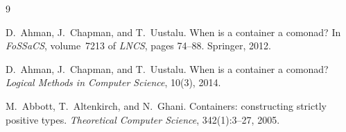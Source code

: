 \documentclass[11pt,a4paper]{article}
\theoremstyle{plain}
\theoremstyle{definition}
\begin{document}
\begin{thebibliography}{9}

D.~Ahman, J.~Chapman, and T.~Uustalu.
\newblock When is a container a comonad?
\newblock In \emph{FoSSaCS}, volume~7213 of \emph{LNCS}, pages 74--88.
\newblock Springer, 2012.

D.~Ahman, J.~Chapman, and T.~Uustalu.
\newblock When is a container a comonad?
\newblock \emph{Logical Methods in Computer Science}, 10(3), 2014.

M.~Abbott, T.~Altenkirch, and N.~Ghani.
\newblock Containers: constructing strictly positive types.
\newblock \emph{Theoretical Computer Science}, 342(1):3--27, 2005.

\end{thebibliography}
\end{document}
